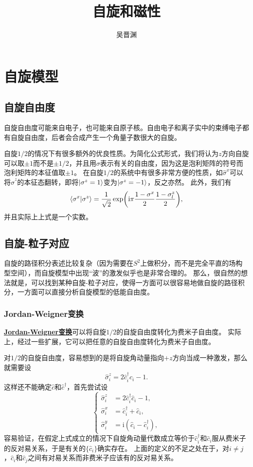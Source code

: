 \documentclass[hyperref, UTF8, a4paper]{ctexart}
\title{自旋和磁性}
\author{吴晋渊}
\newcommand*{\ii}{\mathrm{i}}
\newcommand*{\concept}[1]{\underline{\textbf{#1}}}
\begin{document}
\maketitle

\section{自旋模型}

\subsection{自旋自由度}

自旋自由度可能来自电子，也可能来自原子核。自由电子和离子实中的束缚电子都有自旋自由度，后者会合成产生一个角量子数很大的自旋。

自旋$1/2$的情况下有很多额外的优良性质。为简化公式形式，我们将认为$z$方向自旋可以取$\pm 1$而不是$\pm 1/2$，并且用$\sigma$表示有关的自由度，因为这是泡利矩阵的符号而泡利矩阵的本征值取$\pm 1$。
在自旋$1/2$的系统中有很多非常方便的性质，如$\hat{\sigma}^x$可以将$\hat{\sigma}^z$的本征态翻转，即将$\ket{\sigma^z=1}$变为$\ket{\sigma^z=-1}$，反之亦然。
此外，我们有
\begin{equation}
    \braket{\sigma^x}{\sigma^z} = \frac{1}{\sqrt{2}} \exp(\ii \pi \frac{1 - \sigma^x}{2} \frac{1 - \sigma^z_l}{2}),
\end{equation}
并且实际上上式是一个实数。

\subsection{自旋-粒子对应}

自旋的路径积分表述比较复杂（因为需要在$S^2$上做积分，而不是完全平直的场构型空间），而自旋模型中出现“波”的激发似乎也是非常合理的。
那么，很自然的想法就是，可以找到某种自旋-粒子对应，使得一方面可以很容易地做自旋的路径积分，一方面可以直接分析自旋模型的低能自由度。

\subsubsection{Jordan-Weigner变换}

\concept{Jordan-Weigner变换}可以将自旋$1/2$的自旋自由度转化为费米子自由度。
实际上，经过一些扩展，它可以把任意的自旋自由度转化为费米子自由度。

对$1/2$的自旋自由度，容易想到的是将自旋角动量指向$+z$方向当成一种激发，那么就需要设
\[
    \hat{\sigma}^z_i = 2 \hat{c}^\dagger_i \hat{c}_i - 1.
\]
这样还不能确定$\hat{c}$和$\hat{c}^\dagger$，首先尝试设
\[
    \left\{
        \begin{aligned}
            \hat{\sigma}^z_i &= 2 \hat{c}^\dagger_i \hat{c}_i - 1, \\
            \hat{\sigma}^x_i &= \hat{c}^\dagger_i + \hat{c}_i, \\
            \hat{\sigma}^y_i &= \ii (\hat{c}_i - \hat{c}^\dagger_i),
        \end{aligned}
    \right.
\]
容易验证，在假定上式成立的情况下自旋角动量代数成立等价于$\hat{c}_i^\dagger$和$\hat{c}_i$服从费米子的反对易关系，于是有关的$\{\hat{c}_i\}$确实存在。
上面的定义的不足之处在于，对$i \neq j$，$\hat{c}_i$和$\hat{c}_j$之间有对易关系而非费米子应该有的反对易关系。
\end{document}
